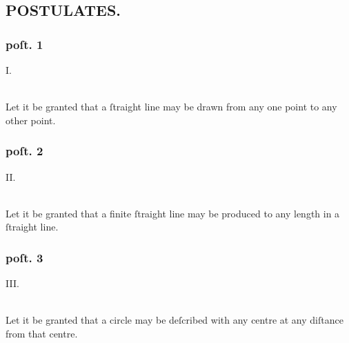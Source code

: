 \begin{minipage}{0.165\textwidth}
  \phantom{}
\end{minipage}%
\begin{minipage}{0.67\textwidth}
  \subsection[Postulates]{\centering \scshape{\LARGE{POSTULATES.}}}
  \label{subsec:postulates}

  \hfill

  \subsubsection{poſt. 1}
  \begin{center}
    I.\label{post1}\\
    \hfill\\
    \raggedright Let it be granted that a ſtraight line may be drawn from any one point to any other point.
  \end{center}
  \subsubsection{poſt. 2}
  \begin{center}
    II.\label{post2}\\
    \hfill\\
    \raggedright Let it be granted that a finite ſtraight line may be produced to any length in a ſtraight line.
  \end{center}
  \subsubsection{poſt. 3}
  \begin{center}
    III.\label{post3}\\
    \hfill\\
    \raggedright Let it be granted that a circle may be deſcribed with any centre at any diſtance from that centre.
  \end{center}
\end{minipage}
\begin{minipage}{0.165\textwidth}
  \phantom{}
\end{minipage}%

\hfill

